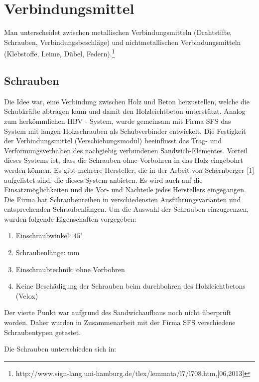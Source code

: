 \chapter{Verbindungsmittel}

Man unterscheidet zwischen metallischen Verbindungsmitteln (Drahtstifte, Schrauben, Verbindungsbeschläge) und nichtmetallischen Verbindungsmitteln (Klebstoffe, Leime, Dübel, Federn).\footnote{http://www.sign-lang.uni-hamburg.de/tlex/lemmata/l7/l708.htm,[06,2013]}



\section{Schrauben}





Die Idee war, eine Verbindung zwischen Holz und Beton herzustellen, welche die Schubkräfte abtragen kann und damit den Holzleichtbeton unterstützt. Analog zum herkömmlichen HBV - System, wurde gemeinsam mit Firma SFS das System mit langen Holzschrauben als Schubverbinder entwickelt. Die Festigkeit der Verbindungsmittel  (Verschiebungsmodul) beeinflusst das Trag- und Verformungsverhalten des nachgiebig verbundenen Sandwich-Elementes. Vorteil dieses Systems ist, dass die Schrauben ohne Vorbohren in das Holz eingebohrt werden können. Es gibt mehrere Hersteller, die in der Arbeit von Schernberger [1] aufgelistet sind, die dieses System anbieten. Es wird auch auf die Einsatzmöglichkeiten und die Vor- und Nachteile jedes Herstellers eingegangen. Die Firma hat Schraubenreihen  in verschiedensten Ausführungsvarianten und entsprechenden Schraubenlängen. Um die Auswahl der Schrauben einzugrenzen, wurden folgende Eigenschaften vorgegeben:


\begin{enumerate} 
	\item Einschraubwinkel: $45^{\circ}$
	\item Schraubenlänge: \unit[400]{mm} 
	\item Einschraubtechnik: ohne Vorbohren
	\item Keine Beschädigung der Schrauben beim durchbohren des Holzleichtbetons (Velox)
\end{enumerate}


Der vierte Punkt war aufgrund des Sandwichaufbaus noch nicht überprüft worden. Daher wurden in Zusammenarbeit mit der Firma SFS verschiedene Schraubentypen getestet. 

Die Schrauben unterschieden sich in: 

